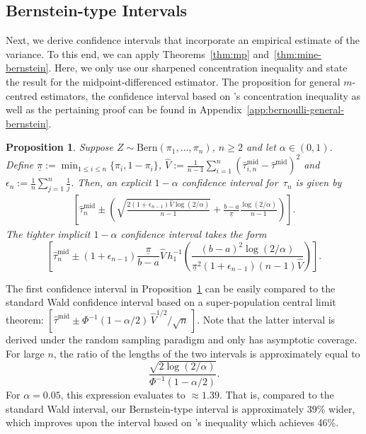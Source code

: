 \documentclass[aos]{imsart2}
\theoremstyle{plain}
\newtheorem{proposition}[theorem]{Proposition}
\theoremstyle{definition}
\newcommand{\vh}{\hat{V}}
\newcommand{\tauhm}{\hat{\tau}^{\mathrm{mid}}}
\newcommand{\bern}{\mathrm{Bern}}
\newcommand{\piu}{\underline{\pi}}
\begin{document}
\subsection{Bernstein-type Intervals} Next, we derive confidence intervals that incorporate an empirical estimate of the variance. To this end, we can apply Theorems~\ref{thm:mp} and~\ref{thm:mine-bernstein}. Here, we only use our sharpened concentration inequality and state the result for the midpoint-differenced estimator. The proposition for general $m$-centred estimators, the confidence interval based on \citet{maurer_empirical_2009}'s concentration inequality as well as the pertaining proof can be found in Appendix~\ref{app:bernoulli-general-bernstein}.

\begin{proposition}\label{prop:confint-bernstein-indep}
    Suppose $Z\sim \bern(\pi_1,\ldots,\pi_n)$, $n\geq 2$ and let $\alpha \in (0,1)$. Define $\piu := \min_{1 \leq i \leq n} \{\pi_i, 1-\pi_i\}$, $\vh := \frac{1}{n-1}\sum_{i=1}^n (\tauhm_{i,n}-\tauhm)^2$ and $\epsilon_n := \frac{1}{n} \sum_{j=1}^{n} \frac{1}{j}$. Then, an explicit $1-\alpha$ confidence interval for~$\tau_n$ is given by
    \begin{gather*}
        \left[\tauhm_n \pm \left(\sqrt{\frac{2(1+\epsilon_{n-1})\vh\log(2/\alpha)}{n-1}} + \frac{b-a}{\piu}\frac{\log(2/\alpha)}{n-1}\right)\right].
    \end{gather*}
    The tighter implicit $1-\alpha$ confidence interval takes the form
    \begin{equation*}
        \left[\tauhm_n \pm (1+\epsilon_{n-1})\frac{\piu}{b-a} \vh\, h_1^{-1}\!\left(\frac{(b-a)^2\log(2/\alpha)}{\piu^2(1+\epsilon_{n-1})(n-1)\vh}\right)\right].
    \end{equation*}
\end{proposition}

The first confidence interval in Proposition~\ref{prop:confint-bernstein-indep} can be easily compared to the standard Wald confidence interval based on a super-population central limit theorem: $[\tauhm \pm \Phi^{-1}(1-\alpha/2) \,\vh^{1/2}/\sqrt{n}\,]$. Note that the latter interval is derived under the random sampling paradigm and only has asymptotic coverage. For large $n$, the ratio of the lengths of the two intervals is approximately equal to
\begin{equation*}
    \frac{\sqrt{2\log(2/\alpha)}}{\Phi^{-1}(1-\alpha/2)}.
\end{equation*}
For $\alpha=0.05$, this expression evaluates to $\approx 1.39$. That is, compared to the standard Wald interval, our Bernstein-type interval is approximately 39\% wider, which improves upon the interval based on \citeauthor{maurer_empirical_2009}'s inequality which achieves 46\%. 
\end{document}
